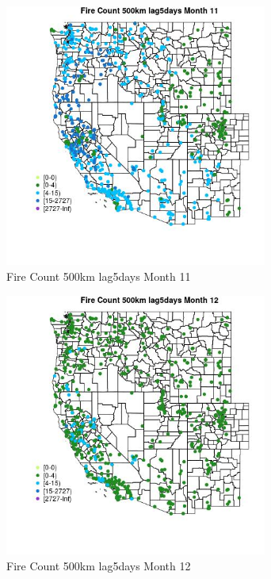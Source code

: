 \begin{figure} 
\centering  
\includegraphics[width=0.77\textwidth]{Code_Outputs/Report_ML_input_PM25_Step4_part_f_de_duplicated_aveswNAs_MapObsMo11Fire_Count_500km_lag5days.jpg} 
\caption{\label{fig:Report_ML_input_PM25_Step4_part_f_de_duplicated_aveswNAsMapObsMo11Fire_Count_500km_lag5days}Fire Count 500km lag5days Month 11} 
\end{figure} 
 

\clearpage 

\begin{figure} 
\centering  
\includegraphics[width=0.77\textwidth]{Code_Outputs/Report_ML_input_PM25_Step4_part_f_de_duplicated_aveswNAs_MapObsMo12Fire_Count_500km_lag5days.jpg} 
\caption{\label{fig:Report_ML_input_PM25_Step4_part_f_de_duplicated_aveswNAsMapObsMo12Fire_Count_500km_lag5days}Fire Count 500km lag5days Month 12} 
\end{figure} 
 

